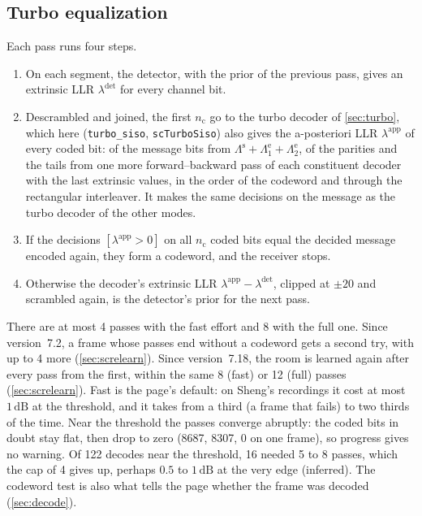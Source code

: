 \documentclass[11pt,a4paper]{article}
\newcommand{\dB}{\,\mathrm{dB}}
\newcommand{\code}[1]{\texttt{#1}}
\newcommand{\nc}{n_{\mathrm{c}}}
\theoremstyle{remark}
\begin{document}
\subsection{Turbo equalization}
\label{sec:scturbo}
Each pass runs four steps.
\begin{enumerate}
\item On each segment, the detector, with the prior of the previous pass, gives an extrinsic LLR $\lambda^{\mathrm{det}}$ for every channel bit.
\item Descrambled and joined, the first $\nc$ go to the turbo decoder of \cref{sec:turbo}, which here (\code{turbo\_siso}, \code{scTurboSiso}) also gives the a-posteriori LLR $\lambda^{\mathrm{app}}$ of every coded bit: of the message bits from $\Lambda^{\mathrm s} + \Lambda^{\mathrm e}_1 + \Lambda^{\mathrm e}_2$, of the parities and the tails from one more forward--backward pass of each constituent decoder with the last extrinsic values, in the order of the codeword and through the rectangular interleaver. It makes the same decisions on the message as the turbo decoder of the other modes.
\item If the decisions $[\lambda^{\mathrm{app}} > 0]$ on all $\nc$ coded bits equal the decided message encoded again, they form a codeword, and the receiver stops.
\item Otherwise the decoder's extrinsic LLR $\lambda^{\mathrm{app}} - \lambda^{\mathrm{det}}$, clipped at $\pm 20$ and scrambled again, is the detector's prior for the next pass.
\end{enumerate}
There are at most 4 passes with the fast effort and 8 with the full one. Since version~7.2, a frame whose passes end without a codeword gets a second try, with up to 4 more (\cref{sec:screlearn}). Since version~7.18, the room is learned again after every pass from the first, within the same 8 (fast) or 12 (full) passes (\cref{sec:screlearn}). Fast is the page's default: on Sheng's recordings it cost at most $1\dB$ at the threshold, and it takes from a third (a frame that fails) to two thirds of the time. Near the threshold the passes converge abruptly: the coded bits in doubt stay flat, then drop to zero (8687, 8307, 0 on one frame), so progress gives no warning. Of 122 decodes near the threshold, 16 needed 5 to 8 passes, which the cap of 4 gives up, perhaps $0.5$ to $1\dB$ at the very edge (inferred). The codeword test is also what tells the page whether the frame was decoded (\cref{sec:decode}).
\end{document}
